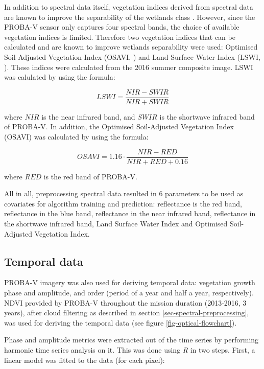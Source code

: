 \documentclass[a4paper,10pt]{book}
\begin{document}
In addition to spectral data itself, vegetation indices derived from spectral data are known to improve the separability of the wetlands class \citep{zhao2009indices,davranche2010wetland}. However, since the PROBA-V sensor only captures four spectral bands, the choice of available vegetation indices is limited. Therefore two vegetation indices that can be calculated and are known to improve wetlands separability were used: Optimised Soil-Adjusted Vegetation Index (OSAVI, \citealt{rondeaux1996osavi}) and Land Surface Water Index (LSWI, \citealt{xiao2004lswi, dong2014lswi}). These indices were calculated from the 2016 summer composite image. LSWI was calulated by using the formula:

$$ LSWI = \frac{NIR - SWIR}{NIR + SWIR} $$

where $NIR$ is the near infrared band, and $SWIR$ is the shortwave infrared band of PROBA-V. In addition, the Optimised Soil-Adjusted Vegetation Index (OSAVI) was calculated by using the formula:

$$ OSAVI = 1.16 \cdot{} \frac{NIR-RED}{NIR+RED+0.16} $$

where $RED$ is the red band of PROBA-V.

All in all, preprocessing spectral data resulted in 6 parameters to be used as covariates for algorithm training and prediction: reflectance is the red band, reflectance in the blue band, reflectance in the near infrared band, reflectance in the shortwave infrared band, Land Surface Water Index and Optimised Soil-Adjusted Vegetation Index.

\subsection{Temporal data}

PROBA-V imagery was also used for deriving temporal data: vegetation growth phase and amplitude,  and  order (period of a year and half a year, respectively). NDVI provided by PROBA-V throughout the mission duration (2013-2016, 3 years), after cloud filtering as described in section \ref{sec-spectral-preprocessing}, was used for deriving the temporal data (see figure \ref{fig-optical-flowchart}).

Phase and amplitude metrics were extracted out of the time series by performing harmonic time series analysis \citep{rayner1971introduction,jakubauskas2001harmonic} on it. This was done using \textit{R} in two steps. First, a linear model was fitted to the data (for each pixel):
\end{document}

